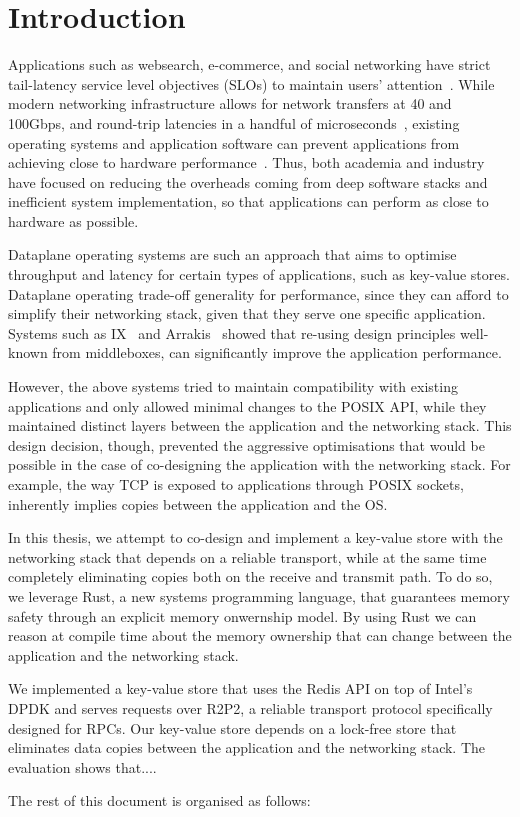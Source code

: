 \chapter{Introduction}

Applications such as websearch, e-commerce, and social networking have strict tail-latency service level objectives (SLOs) to maintain users' attention~\cite{url:attention}.
While modern networking infrastructure allows for network transfers at 40 and 100Gbps, and round-trip latencies in a handful of microseconds~\cite{XXX}, existing operating systems and application software can prevent applications from achieving close to hardware performance~\cite{ix}.
Thus, both academia and industry have focused on reducing the overheads coming from deep software stacks and inefficient system implementation, so that applications can perform as close to hardware as possible.

Dataplane operating systems are such an approach that aims to optimise throughput and latency for certain types of applications, such as key-value stores.
Dataplane operating trade-off generality for performance, since they can afford to simplify their networking stack, given that they serve one specific application.
Systems such as IX~\cite{ix} and Arrakis~\cite{arrakis} showed that re-using design principles well-known from middleboxes, can significantly improve the application performance.

However, the above systems tried to maintain compatibility with existing applications and only allowed minimal changes to the POSIX API, while they maintained distinct layers between the application and the networking stack.
This design decision, though, prevented the aggressive optimisations that would be possible in the case of co-designing the application with the networking stack.
For example, the way TCP is exposed to applications through POSIX sockets, inherently implies copies between the application and the OS.

In this thesis, we attempt to co-design and implement a key-value store with the networking stack that depends on a reliable transport, while at the same time completely eliminating copies both on the receive and transmit path.
To do so, we leverage Rust, a new systems programming language, that guarantees memory safety through an explicit memory onwernship model.
By using Rust we can reason at compile time about the memory ownership that can change between the application and the networking stack.

We implemented a key-value store that uses the Redis API on top of Intel's DPDK and serves requests over R2P2, a reliable transport protocol specifically designed for RPCs.
Our key-value store depends on a lock-free store that eliminates data copies between the application and the networking stack.
The evaluation shows that....

The rest of this document is organised as follows:
